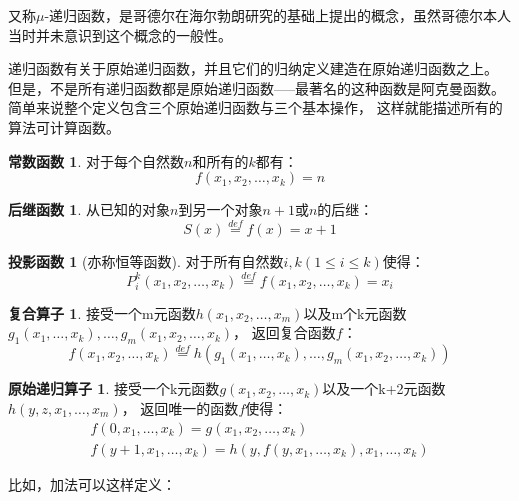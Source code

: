 \documentclass[12pt,a4paper]{ctexrep}
\theoremstyle{definition}
\newtheorem{con}[rf]{常数函数}
\newtheorem{suc}[rf]{后继函数}
\newtheorem{pro}[rf]{投影函数}
\newtheorem{com}[rf]{复合算子}
\newtheorem{pri}[rf]{原始递归算子}
\begin{document}
又称$\mu$-递归函数，是哥德尔在海尔勃朗研究的基础上提出的概念，虽然哥德尔本人
当时并未意识到这个概念的一般性。

递归函数有关于原始递归函数，并且它们的归纳定义建造在原始递归函数之上。
但是，不是所有递归函数都是原始递归函数-----最著名的这种函数是阿克曼函数。
简单来说整个定义包含三个原始递归函数与三个基本操作，
这样就能描述所有的算法可计算函数。

\begin{con}
对于每个自然数$n$和所有的$k$都有：
\begin{equation}
f(x_1,x_2,\ldots,x_k)=n
\end{equation}
\end{con}

\begin{suc}
从已知的对象$n$到另一个对象$n+1$或$n$的后继：
\begin{equation}
S(x)\stackrel{def}{=}f(x)=x+1
\end{equation}
\end{suc}

\begin{pro}[亦称恒等函数]
对于所有自然数$i,k(1\leq i \leq k)$使得：
\begin{equation}
P^k_i(x_1,x_2,\ldots,x_k) \stackrel{def}{=}f(x_1,x_2,\ldots,x_k)=x_i
\end{equation}
\end{pro}

\begin{com}
接受一个m元函数$h(x_1,x_2,\ldots,x_m)$以及m个k元函数$g_1(x_1,\ldots,x_k),\ldots,g_m(x_1,x_2,\ldots,x_k)$，
返回复合函数$f$：
\begin{equation}
f(x_1,x_2,\ldots,x_k) \stackrel{def}{=}h(g_1(x_1,\ldots,x_k),\ldots,g_m(x_1,x_2,\ldots,x_k))
\end{equation}
\end{com}

\begin{pri}
接受一个k元函数$g(x_1,x_2,\ldots,x_k)$以及一个k+2元函数$h(y,z,x_1,\ldots,x_m)$，
返回唯一的函数$f$使得：
\begin{equation}
\begin{split}
f(0,x_1,\ldots,x_k) = g(x_1,x_2,\ldots,x_k)\\
f(y+1,x_1,\ldots,x_k) = h(y,f(y,x_1,\ldots,x_k),x_1,\ldots,x_k)
\end{split}
\end{equation}
\end{pri}

比如，加法可以这样定义：%
\end{document}
